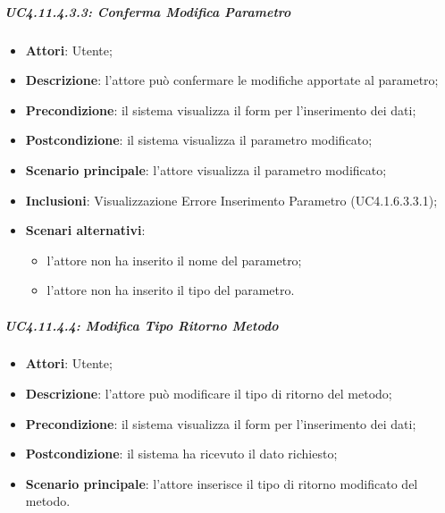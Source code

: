 \begin{itemize}
\begin{itemize}
\begin{itemize}
\begin{itemize}
\subparagraph{UC4.11.4.3.3: Conferma Modifica Parametro}
\label{UC4.11.4.3.3}
\begin{itemize}
	\item \textbf{Attori}: Utente;
	\item \textbf{Descrizione}: l'attore può confermare le modifiche apportate al parametro;
	\item \textbf{Precondizione}: il sistema visualizza il form per l'inserimento dei dati;
	\item \textbf{Postcondizione}: il sistema visualizza il parametro modificato;
	\item \textbf{Scenario principale}: l'attore visualizza il parametro modificato;
	\item \textbf{Inclusioni}:
	Visualizzazione Errore Inserimento Parametro (UC4.1.6.3.3.1);
	\item \textbf{Scenari alternativi}:
	\begin{itemize}
		\item l'attore non ha inserito il nome del parametro;
		\item l'attore non ha inserito il tipo del parametro.
	\end{itemize}
\end{itemize}

\subparagraph{UC4.11.4.4: Modifica Tipo Ritorno Metodo}
\label{UC4.11.4.4}
\begin{itemize}
	\item \textbf{Attori}: Utente;
	\item \textbf{Descrizione}: l'attore può modificare il tipo di ritorno del metodo;
	\item \textbf{Precondizione}: il sistema visualizza il form per l'inserimento dei dati;
	\item \textbf{Postcondizione}: il sistema ha ricevuto il dato richiesto;
	\item \textbf{Scenario principale}: l'attore inserisce il tipo di ritorno modificato del metodo.
\end{itemize}


\end{itemize}
\end{itemize}
\end{itemize}
\end{itemize}
